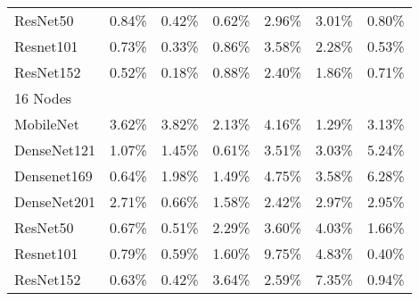 \begin{table}
\begin{tabular}{lllllll}
    ResNet50    & 0.84\%  & 0.42\% & 0.62\% & 2.96\% & 3.01\%  & 0.80\% \\
    Resnet101   & 0.73\%  & 0.33\% & 0.86\% & 3.58\% & 2.28\%  & 0.53\% \\
    ResNet152   & 0.52\%  & 0.18\% & 0.88\% & 2.40\% & 1.86\%  & 0.71\% \\ \hline
    16 Nodes    & ~       & ~      & ~      & ~      & ~       & ~      \\
    MobileNet   & 3.62\%  & 3.82\% & 2.13\% & 4.16\% & 1.29\%  & 3.13\% \\
    DenseNet121 & 1.07\%  & 1.45\% & 0.61\% & 3.51\% & 3.03\%  & 5.24\% \\
    Densenet169 & 0.64\%  & 1.98\% & 1.49\% & 4.75\% & 3.58\%  & 6.28\% \\
    DenseNet201 & 2.71\%  & 0.66\% & 1.58\% & 2.42\% & 2.97\%  & 2.95\% \\
    ResNet50    & 0.67\%  & 0.51\% & 2.29\% & 3.60\% & 4.03\%  & 1.66\% \\
    Resnet101   & 0.79\%  & 0.59\% & 1.60\% & 9.75\% & 4.83\%  & 0.40\% \\
    ResNet152   & 0.63\%  & 0.42\% & 3.64\% & 2.59\% & 7.35\%  & 0.94\% \\
    \end{tabular}
    \label{tbl:pap_hvd_narval_err}
\end{table}